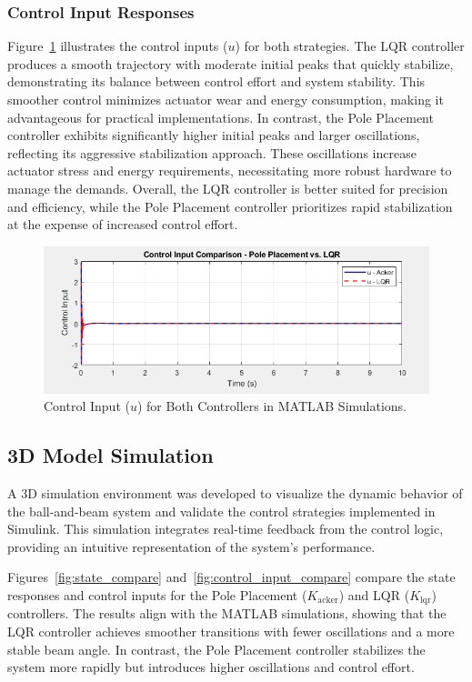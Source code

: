 \documentclass[conference]{IEEEtran}
\begin{document}
\subsubsection{Control Input Responses}
Figure~\ref{fig:control_input_sim} illustrates the control inputs (\(u\)) for both strategies. The LQR controller produces a smooth trajectory with moderate initial peaks that quickly stabilize, demonstrating its balance between control effort and system stability. This smoother control minimizes actuator wear and energy consumption, making it advantageous for practical implementations. In contrast, the Pole Placement controller exhibits significantly higher initial peaks and larger oscillations, reflecting its aggressive stabilization approach. These oscillations increase actuator stress and energy requirements, necessitating more robust hardware to manage the demands. Overall, the LQR controller is better suited for precision and efficiency, while the Pole Placement controller prioritizes rapid stabilization at the expense of increased control effort.


\begin{figure}[H]
    \centering
    \includegraphics[width=0.8\linewidth]{figures/control_input_sim.png}
    \caption{Control Input (\(u\)) for Both Controllers in MATLAB Simulations.}
    \label{fig:control_input_sim}
\end{figure}

\subsection{3D Model Simulation}
\label{subsec:3d_simulation}

A 3D simulation environment was developed to visualize the dynamic behavior of the ball-and-beam system and validate the control strategies implemented in Simulink. This simulation integrates real-time feedback from the control logic, providing an intuitive representation of the system's performance.

Figures~\ref{fig:state_compare} and~\ref{fig:control_input_compare} compare the state responses and control inputs for the Pole Placement (\(K_{\text{acker}}\)) and LQR (\(K_{\text{lqr}}\)) controllers. The results align with the MATLAB simulations, showing that the LQR controller achieves smoother transitions with fewer oscillations and a more stable beam angle. In contrast, the Pole Placement controller stabilizes the system more rapidly but introduces higher oscillations and control effort.
\end{document}

